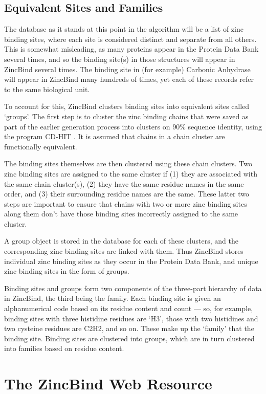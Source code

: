 \subsection{Equivalent Sites and Families}

The database as it stands at this point in the algorithm will be a list of zinc binding sites, where each site is considered distinct and separate from all others. This is somewhat misleading, as many proteins appear in the Protein Data Bank several times, and so the binding site(s) in those structures will appear in ZincBind several times. The binding site in (for example) Carbonic Anhydrase will appear in ZincBind many hundreds of times, yet each of these records refer to the same biological unit.

To account for this, ZincBind clusters binding sites into equivalent sites called `groups'. The first step is to cluster the zinc binding chains that were saved as part of the earlier generation process into clusters on 90\% sequence identity, using the program CD-HIT \cite{li2006cdhit}. It is assumed that chains in a chain cluster are functionally equivalent.

The binding sites themselves are then clustered using these chain clusters. Two zinc binding sites are assigned to the same cluster if (1) they are associated with the same chain cluster(s), (2) they have the same residue names in the same order, and (3) their surrounding residue names are the same. These latter two steps are important to ensure that chains with two or more zinc binding sites along them don't have those binding sites incorrectly assigned to the same cluster.

A group object is stored in the database for each of these clusters, and the corresponding zinc binding sites are linked with them. Thus ZincBind stores individual zinc binding sites as they occur in the Protein Data Bank, and unique zinc binding sites in the form of groups.

Binding sites and groups form two components of the three-part hierarchy of data in ZincBind, the third being the family. Each binding site is given an alphanumerical code based on its residue content and count --- so, for example, binding sites with three histidine residues are `H3', those with two histidines and two cysteine residues are C2H2, and so on. These make up the `family' that the binding site. Binding sites are clustered into groups, which are in turn clustered into families based on residue content.

\section{The ZincBind Web Resource}

